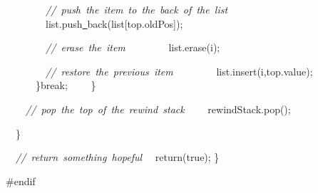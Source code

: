 {\ \ \ \ \ \ \ \ \textsl{//\ push\ the\ item\ to\ the\ back\ of\ the\ list}
\ \ \ \ \ \ \ \ list.push\underline\ back(list[top.oldPos]);

\ \ \ \ \ \ \ \ \textsl{//\ erase\ the\ item}
\ \ \ \ \ \ \ \ list.erase(i);

\ \ \ \ \ \ \ \ \textsl{//\ restore\ the\ previous\ item}
\ \ \ \ \ \ \ \ list.insert(i,top.value);
\ \ \ \ \ \ \}break;
\ \ \ \ \}

\ \ \ \ \textsl{//\ pop\ the\ top\ of\ the\ rewind\ stack}
\ \ \ \ rewindStack.pop();

\ \ \}

\ \ \textsl{//\ return\ something\ hopeful}
\ \ return(true);
\}

\#endif

 }
\normalfont\normalsize

